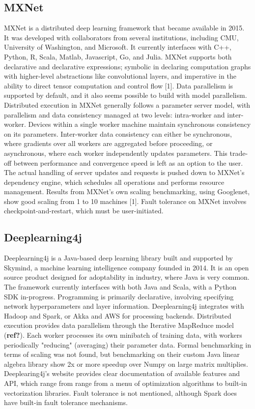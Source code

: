 \documentclass{article}
\begin{document}
\subsection{MXNet}
MXNet is a distributed deep learning framework that became available in 2015. It was developed with collaborators from several institutions, including CMU, University of Washington, and Microsoft. It currently interfaces with C++, Python, R, Scala, Matlab, Javascript, Go, and Julia. MXNet supports both declarative and declarative expressions; symbolic in declaring computation graphs with higher-level abstractions like convolutional layers, and imperative in the ability to direct tensor computation and control flow [1]. Data parallelism is supported by default, and it also seems possible to build with model parallelism. Distributed execution in MXNet generally follows a parameter server model, with parallelism and data consistency managed at two levels: intra-worker and inter-worker. Devices within a single worker machine maintain synchronous consistency on its parameters. Inter-worker data consistency can either be synchronous, where gradients over all workers are aggregated before proceeding, or asynchronous, where each worker independently updates parameters. This trade-off between performance and convergence speed is left as an option to the user. The actual handling of server updates and requests is pushed down to MXNet's dependency engine, which schedules all operations and performs resource management. Results from MXNet's own scaling benchmarking, using Googlenet, show good scaling from 1 to 10 machines [1]. Fault tolerance on MXNet involves checkpoint-and-restart, which must be user-initiated. 

\subsection{Deeplearning4j}
Deeplearning4j is a Java-based deep learning library built and supported by Skymind, a machine learning intelligence company founded in 2014. It is an open source product designed for adoptability in industry, where Java is very common. The framework currently interfaces with both Java and Scala, with a Python SDK in-progress. Programming is primarily declarative, involving specifying network hyperparameters and layer information. Deeplearning4j integrates with Hadoop and Spark, or Akka and AWS for processing backends. Distributed execution provides data parallelism through the Iterative MapReduce model (\textbf{ref?}). Each worker processes its own minibatch of training data, with workers periodically "reducing" (averaging) their parameter data. Formal benchmarking in terms of scaling was not found, but benchmarking on their custom Java linear algebra library show 2x or more speedup over Numpy on large matrix multiplies. Deeplearing4j's website provides clear documentation of available features and API, which range from range from a menu of optimization algorithms to built-in vectorization libraries. Fault tolerance is not mentioned, although Spark does have built-in fault tolerance mechanisms. 
\end{document}

